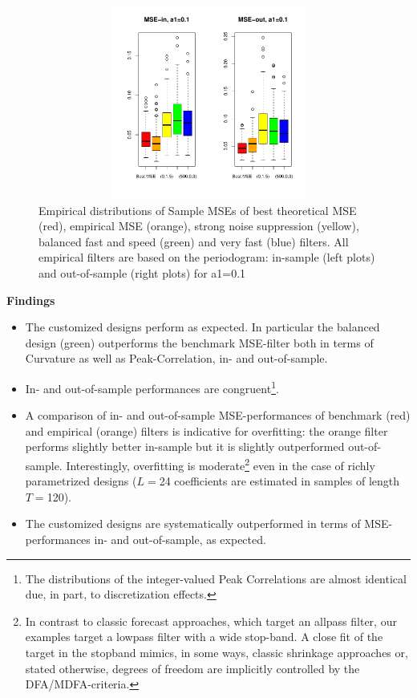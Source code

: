 \documentclass[a4paper]{book}
\begin{document}
\begin{figure}[H]\begin{center}\includegraphics[height=2.5in, width=5in]{z_box_plot_emp_per_perf_mse_inout_2}\caption{Empirical distributions
  of Sample MSEs of best theoretical MSE (red), empirical MSE (orange), strong noise suppression (yellow), balanced fast and speed (green) and very fast (blue) filters. All empirical filters are based on the periodogram:
  in-sample (left plots) and out-of-sample (right plots) for a1=0.1\label{z_box_plot_emp_per_perf_mse_inout_2}}\end{center}\end{figure}
\textbf{Findings}
\begin{itemize}
\item The customized designs perform as expected. In particular the balanced design (green) outperforms the benchmark MSE-filter both in terms of Curvature as well as Peak-Correlation, in- and out-of-sample. 
\item In- and out-of-sample performances are congruent\footnote{The distributions of the integer-valued Peak Correlations are almost identical due, in part, to discretization effects.}.  
\item A comparison of in- and out-of-sample MSE-performances of benchmark (red) and empirical (orange) filters is indicative for overfitting: the orange filter performs slightly better in-sample but it is slightly outperformed out-of-sample. Interestingly, overfitting is moderate\footnote{In contrast to classic forecast approaches, which target an allpass filter, our examples target a lowpass filter with a wide stop-band. A close fit of the target in the stopband mimics, in some ways, classic shrinkage approaches or, stated otherwise, degrees of freedom are implicitly controlled by the DFA/MDFA-criteria.} even in the case of richly parametrized designs ($L=$24 coefficients are estimated in samples of length $T=$120).
\item The customized designs are systematically outperformed in terms of MSE-performances in- and out-of-sample, as expected. 
\end{itemize}
\end{document}
